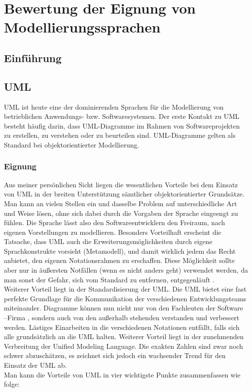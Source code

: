 

\chapter{Bewertung der Eignung von Modellierungssprachen}
\label{ch:BewertungModellierungssprachen}
\section{Einführung}
\section{UML}
UML ist heute eine der dominierenden Sprachen für die Modellierung von betrieblichen Anwendungs- bzw. Softwaresystemen. Der erste Kontakt zu UML besteht häufig darin, dass UML-Diagramme im Rahmen von Softwareprojekten zu erstellen, zu verstehen oder zu beurteilen sind. UML-Diagramme gelten als Standard bei objektorientierter Modellierung.
\subsection{Eignung}

Aus meiner persönlichen Sicht liegen die wesentlichen Vorteile bei dem Einsatz von UML in der breiten Unterstützung sämtlicher objektorientierter Grundsätze. Man kann an vielen Stellen ein und dasselbe Problem auf unterschiedliche Art und Weise lösen, ohne sich dabei durch die Vorgaben der Sprache eingeengt zu fühlen. Die Sprache lässt also den Softwareentwicklern den Freiraum, nach eigenen Vorstellungen zu modellieren. Besonders Vorteilhaft erscheint die Tatsache, dass UML auch die Erweiterungsmöglichkeiten durch eigene Sprachkonstrukte vorsieht (Metamodell), und damit wirklich jedem das Recht anbietet, den eigenen Notationsrahmen zu erschaffen. Diese Möglichkeit sollte aber nur in äußersten Notfällen (wenn es nicht anders geht) verwendet werden, da man sonst der Gefahr, sich vom Standard zu entfernen, entgegenläuft .\\
Weiterer Vorteil liegt in der Standardisierung der UML. Die  UML bietet eine fast perfekte Grundlage für die Kommunikation der verschiedenen Entwicklungsteams miteinander. Diagramme können nun nicht nur von den Fachleuten der Software –Firma , sondern auch von den außerhalb stehenden verstanden und verbessert werden. Lästiges  Einarbeiten in die verschiedenen Notationen entfällt, falls sich alle grundsätzlich an die UML halten. 
Weiterer Vorteil liegt in der zunehmenden Verbreitung der Unified Modeling Language. Die exakten Zahlen sind zwar noch schwer abzuschätzen, es zeichnet sich jedoch ein wachsender Trend für den Einsatz der UML ab.\\
Man kann die Vorteile von UML in vier wichtigste Punkte zusammenfassen wie folge:\\

